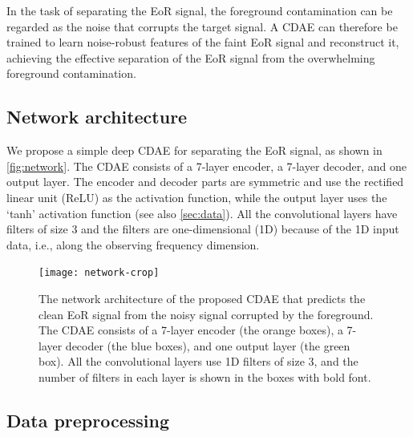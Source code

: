 \documentclass[letters,a4paper,fleqn,usenatbib]{mnras}
\begin{document}
In the task of separating the EoR signal, the foreground contamination
can be regarded as the noise that corrupts the target signal.
A CDAE can therefore be trained to learn noise-robust features of the
faint EoR signal and reconstruct it, achieving the effective separation
of the EoR signal from the overwhelming foreground contamination.


\subsection{Network architecture}
\label{sec:architecture}

We propose a simple deep CDAE for separating the EoR signal, as shown
in \autoref{fig:network}.
The CDAE consists of a 7-layer encoder, a 7-layer decoder,
and one output layer.
The encoder and decoder parts are symmetric and use the rectified
linear unit (ReLU) as the activation function, while the output layer
uses the `tanh' activation function (see also \autoref{sec:data}).
All the convolutional layers have filters of size 3 and the filters
are one-dimensional (1D) because of the 1D input data, i.e., along the
observing frequency dimension.

\begin{figure}
  \centering
  \texttt{[image: network-crop]}
  \caption{\label{fig:network}%
    The network architecture of the proposed CDAE that
    predicts the clean EoR signal from the noisy signal corrupted by
    the foreground.
    The CDAE consists of a 7-layer encoder (the orange boxes),
    a 7-layer decoder (the blue boxes), and one output layer
    (the green box).
    All the convolutional layers use 1D filters of size 3, and
    the number of filters in each layer is shown in the boxes
    with bold font.}
\end{figure}


\subsection{Data preprocessing}
\label{sec:data}
\end{document}
